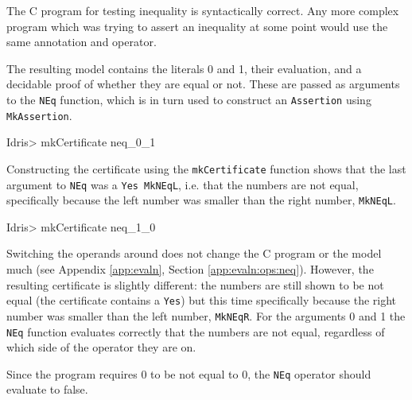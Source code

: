         The C program for testing inequality is syntactically correct. Any more complex program which was trying to assert an inequality at some point would use the same annotation and operator.
        
        \newpage
        
        
        The resulting \Idris model contains the literals 0 and 1, their evaluation, and a decidable proof of whether they are equal or not. These are passed as arguments to the \texttt{NEq} function, which is in turn used to construct an \texttt{Assertion} using \texttt{MkAssertion}.
        
        \begin{code}
Idris> mkCertificate neq_0_1
        \end{code}
        
        Constructing the certificate using the \texttt{mkCertificate} function shows that the last argument to \texttt{NEq} was a \texttt{Yes MkNEqL}, i.e. that the numbers are not equal, specifically because the left number was smaller than the right number, \texttt{MkNEqL}.
        
        \newpage
        
        \begin{code}
Idris> mkCertificate neq_1_0
        \end{code}
        
        Switching the operands around does not change the C program or the model much (see Appendix \ref{app:evaln}, Section \ref{app:evaln:ops:neq}). However, the resulting certificate is slightly different: the numbers are still shown to be not equal (the certificate contains a \texttt{Yes}) but this time specifically because the right number was smaller than the left number, \texttt{MkNEqR}.
        For the arguments 0 and 1 the \texttt{NEq} function evaluates correctly that the numbers are not equal, regardless of which side of the operator they are on.
        
        
        
        
        Since the program requires 0 to be not equal to 0, the \texttt{NEq} operator should evaluate to false.
        
